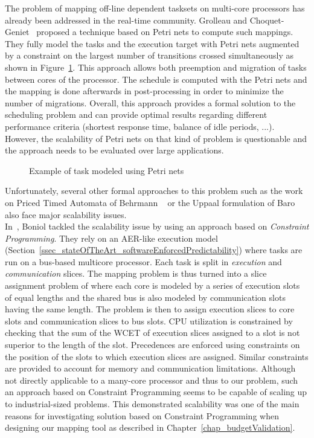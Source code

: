 \documentclass[main.tex]{subfiles}
\begin{document}
The problem of mapping off-line dependent tasksets on multi-core processors has
already been addressed in the real-time community. Grolleau and
Choquet-Geniet~\cite{Grolleau2001} proposed a technique based on Petri nets to
compute such mappings. They fully model the tasks and the execution target with
Petri nets augmented by a constraint on the largest number of transitions
crossed simultaneously as shown in
Figure~\ref{fig_stateOfTheArt_2_taskPetriNet}. This approach allows both
preemption and migration of tasks between cores of the processor. The schedule
is computed with the Petri nets and the mapping is done afterwards in
post-processing in order to minimize the number of migrations. Overall, this
approach provides a formal solution to the scheduling problem and can provide
optimal results regarding different performance criteria (shortest response
time, balance of idle periods, ...). However, the scalability of Petri nets on
that kind of problem is questionable and the approach needs to be evaluated
over large applications. 

\begin{figure}
    \centering
    \scalebox{0.9}{}
    \caption{Example of task modeled using Petri nets}
    \label{fig_stateOfTheArt_2_taskPetriNet}
\end{figure}

Unfortunately, several other formal approaches to this problem such as the work
on Priced Timed Automata of Behrmann \etal~\cite{Behrmann2005} or the {\sc
Uppaal} formulation of Baro \etal~\cite{Baro2012} also face major scalability
issues.\\

In~\cite{Boniol2008}, Boniol \etal tackled the scalability issue by using an
approach based on \emph{Constraint Programming}. They rely on an AER-like
execution model
(Section~\ref{ssec_stateOfTheArt_softwareEnforcedPredictability}) where tasks
are run on a bus-based multicore processor. Each task is split in
\emph{execution} and \emph{communication} slices. The mapping problem is thus
turned into a slice assignment problem of where each core is modeled by a
series of execution slots of equal lengths and the shared bus is also modeled
by communication slots having the same length. The problem is then to assign
execution slices to core slots and communication slices to bus slots. CPU
utilization is constrained by checking that the sum of the WCET of execution
slices assigned to a slot is not superior to the length of the slot.
Precedences are enforced using constraints on the position of the slots to
which execution slices are assigned. Similar constraints are provided to
account for memory and communication limitations. Although not directly
applicable to a many-core processor and thus to our problem, such an approach
based on Constraint Programming seems to be capable of scaling up to
industrial-sized problems. This demonstrated scalability was one of the main
reasons for investigating solution based on Constraint Programming when
designing our mapping tool as described in Chapter~\ref{chap_budgetValidation}.
\end{document}
